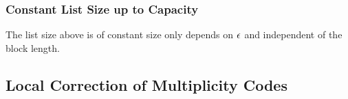 \subsubsection{Constant List Size up to Capacity}

\begin{Theorem}{\cite{KoppartyRonZewiSarafWootters_2018_IDo_CONF}}{}
The list size above is of constant size only depends on $\epsilon$ and independent of the block length.
\end{Theorem}
\subsection{Local Correction of Multiplicity Codes}